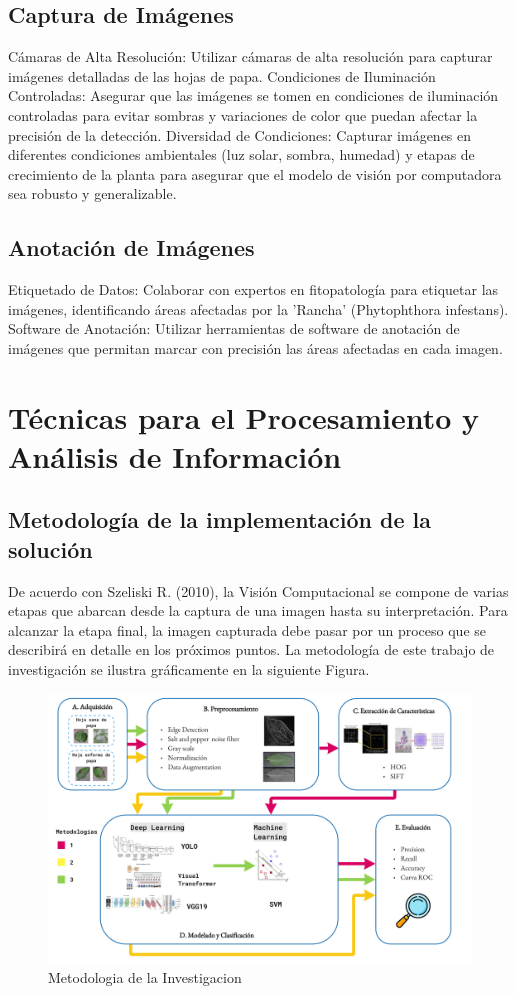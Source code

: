 \subsection{Captura de Imágenes}
Cámaras de Alta Resolución: Utilizar cámaras de alta resolución para capturar imágenes detalladas de las hojas de papa.
Condiciones de Iluminación Controladas: Asegurar que las imágenes se tomen en condiciones de iluminación controladas para evitar sombras y variaciones de color que puedan afectar la precisión de la detección.
Diversidad de Condiciones: Capturar imágenes en diferentes condiciones ambientales (luz solar, sombra, humedad) y etapas de crecimiento de la planta para asegurar que el modelo de visión por computadora sea robusto y generalizable.

\subsection{Anotación de Imágenes}
Etiquetado de Datos: Colaborar con expertos en fitopatología para etiquetar las imágenes, identificando áreas afectadas por la 'Rancha' (Phytophthora infestans).
Software de Anotación: Utilizar herramientas de software de anotación de imágenes que permitan marcar con precisión las áreas afectadas en cada imagen.

\section{Técnicas para el Procesamiento y Análisis de Información}
\subsection{Metodología de la implementación de la solución}
De acuerdo con Szeliski R. (2010), la Visión Computacional se compone de varias etapas que abarcan desde la captura de una imagen hasta su interpretación. Para alcanzar la etapa final, la imagen capturada debe pasar por un proceso que se describirá en detalle en los próximos puntos. La metodología de este trabajo de investigación se ilustra gráficamente en la siguiente Figura.
\begin{figure}[H]
	\begin{center}
		\includegraphics[width=1\textwidth]{3/figures/metodologia.jpg}
		\caption{Metodologia de la Investigacion}
		\label{}
	\end{center}
\end{figure}

